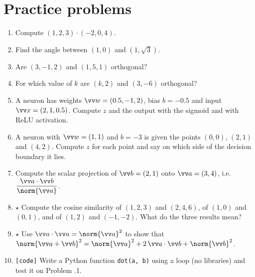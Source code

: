 \section*{Practice problems}
\begin{enumerate}[label=\textbf{\thechapter.\arabic*}]
  \item Compute $(1,2,3)\cdot(-2,0,4)$.
  \item Find the angle between $(1,0)$ and $(1,\sqrt3)$.
  \item Are $(3,-1,2)$ and $(1,5,1)$ orthogonal?
  \item For which value of $k$ are $(k,2)$ and $(3,-6)$ orthogonal?
  \item A neuron has weights $\vv w=(0.5,-1,2)$, bias $b=-0.5$ and input $\vv x=(2,1,0.5)$. Compute $z$ and the output with the sigmoid and with ReLU activation.
  \item A neuron with $\vv w=(1,1)$ and $b=-3$ is given the points $(0,0)$, $(2,1)$ and $(4,2)$. Compute $z$ for each point and say on which side of the decision boundary it lies.
  \item Compute the scalar projection of $\vv b=(2,1)$ onto $\vv a=(3,4)$, i.e.\ $\dfrac{\vv a\cdot\vv b}{\norm{\vv a}}$.
  \item $\star$ Compute the cosine similarity of $(1,2,3)$ and $(2,4,6)$, of $(1,0)$ and $(0,1)$, and of $(1,2)$ and $(-1,-2)$. What do the three results mean?
  \item $\star$ Use $\vv a\cdot\vv a=\norm{\vv a}^2$ to show that $\norm{\vv a+\vv b}^2=\norm{\vv a}^2+2\,\vv a\cdot\vv b+\norm{\vv b}^2$.
  \item \texttt{[code]} Write a Python function \texttt{dot(a, b)} using a loop (no libraries) and test it on Problem \thechapter.1.
\end{enumerate}

